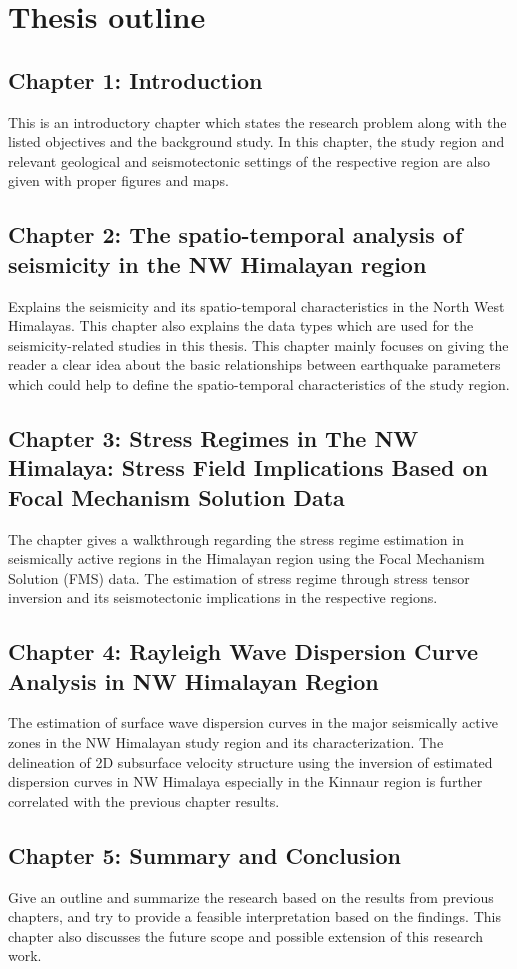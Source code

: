 \section{Thesis outline}

\subsection{Chapter 1: Introduction}
This is an introductory chapter which states the research problem along with the listed objectives and the background study. In this chapter, the study region and relevant geological and seismotectonic settings of the respective region are also given with proper figures and maps.

\subsection{Chapter 2: The spatio-temporal analysis of seismicity in the NW Himalayan region}
Explains the seismicity and its spatio-temporal characteristics in the North West Himalayas. This chapter also explains the data types which are used for the seismicity-related studies in this thesis. This chapter mainly focuses on giving the reader a clear idea about the basic relationships between earthquake parameters which could help to define the spatio-temporal characteristics of the study region.

\subsection{Chapter 3: Stress Regimes in The NW Himalaya: Stress Field Implications Based on Focal Mechanism Solution Data}
The chapter gives a walkthrough regarding the stress regime estimation in seismically active regions in the Himalayan region using the Focal Mechanism Solution (FMS) data. The estimation of stress regime through stress tensor inversion and its seismotectonic implications in the respective regions.


\subsection{Chapter 4: Rayleigh Wave Dispersion Curve Analysis in NW Himalayan Region}
The estimation of surface wave dispersion curves in the major seismically active zones in the NW Himalayan study region and its characterization. The delineation of 2D subsurface velocity structure using the inversion of estimated dispersion curves in NW Himalaya especially in the Kinnaur region is further correlated with the previous chapter results.	

\subsection{Chapter 5: Summary and Conclusion}
Give an outline and summarize the research based on the results from previous chapters, and try to provide a feasible interpretation based on the findings. This chapter also discusses the future scope and possible extension of this research work.